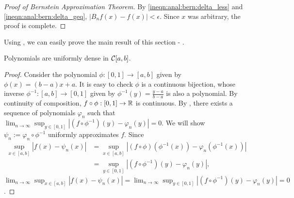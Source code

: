 \begin{proof}[Proof of Bernstein Approximation Theorem]
By \ref{ineqn:anal:bern:delta_less} and \ref{ineqn:anal:bern:delta_geq}, $\left | B_{n} f (x) - f(x) \right | < \epsilon$. Since $x$ was arbitrary, the proof is complete.

\end{proof}
Using , we can easily prove the main result of this section - .

\begin{theorem}
\label{thm:anal:weierstrass-approx}
Polynomials are uniformly dense in ${\mathcal C}[a,b]$.
\end{theorem}
\begin{proof}
Consider the polynomial $\phi : [0, 1] \to [a,b]$ given by $\phi(x) = (b - a)x + a$. It is easy to check $\phi$ is a continuous bijection, whose inverse $\phi^{-1} : [a, b] \to [0, 1]$ given by $\phi^{-1} (y) =  \frac{y - a}{b - a}$ is also a polynomial. By continuity of composition, $f \circ \phi : [0,1] \to {\mathbb R}$ is continuous. By , there exists a sequence of polynomials $\varphi_n$ such that $\lim_{n \to \infty} \sup_{y \in [0,1]} | (f \circ \phi^{-1}) (y) - \varphi_n(y) | = 0$. We will show $\psi_n := \varphi_n \circ \phi^{-1}$ uniformly approximates $f$. Since
\begin{align*}
    \sup_{x \in [a,b]} | f(x) - \psi_n(x) | &= \sup_{x \in [a,b]} | (f \circ \phi) (\phi^{-1}(x)) - \varphi_n (\phi^{-1}(x)) |  \\  &= \sup_{y \in [0,1]} | (f \circ \phi^{-1}) (y) - \varphi_n(y)|,
\end{align*}
$\lim_{n \to \infty} \sup_{x \in [a,b]} | f(x) - \psi_n(x) | = \lim_{n \to \infty} \sup_{y \in [0,1]} | (f \circ \phi^{-1}) (y) - \varphi_n(y) | = 0$.
\end{proof}
